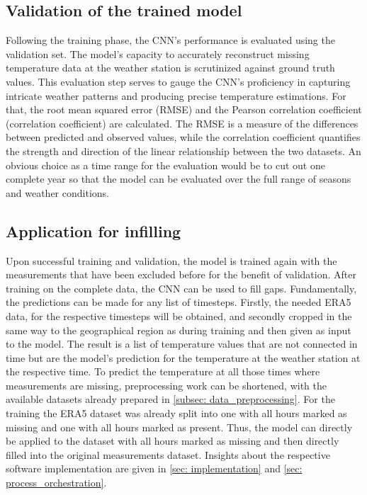 \subsection{Validation of the trained model}
Following the training phase, the CNN's performance is evaluated using the validation set.
The model's capacity to accurately reconstruct missing temperature data at the weather station is scrutinized against ground truth values.
This evaluation step serves to gauge the CNN's proficiency in capturing intricate weather patterns and producing precise temperature estimations.
For that, the root mean squared error (RMSE) and the Pearson correlation coefficient (correlation coefficient) are calculated.
The RMSE is a measure of the differences between predicted and observed values, while the correlation coefficient quantifies the strength and direction of the linear relationship between the two datasets.
An obvious choice as a time range for the evaluation would be to cut out one complete year so that the model can be evaluated over the full range of seasons and weather conditions.

\subsection{Application for infilling}
Upon successful training and validation, the model is trained again with the measurements that have been excluded before for the benefit of validation.
After training on the complete data, the CNN can be used to fill gaps.
Fundamentally, the predictions can be made for any list of timesteps. Firstly, the needed ERA5 data, for the respective timesteps will be obtained, and secondly cropped in the same way to the geographical region as during training and then given as input to the model.
The result is a list of temperature values that are not connected in time but are the model's prediction for the temperature at the weather station at the respective time.
To predict the temperature at all those times where measurements are missing, preprocessing work can be shortened, with the available datasets already prepared in \ref{subsec: data_preprocessing}.
For the training the ERA5 dataset was already split into one with all hours marked as missing and one with all hours marked as present.
Thus, the model can directly be applied to the dataset with all hours marked as missing and then directly filled into the original measurements dataset.
Insights about the respective software implementation are given in \autoref{sec: implementation} and \autoref{sec: process_orchestration}.